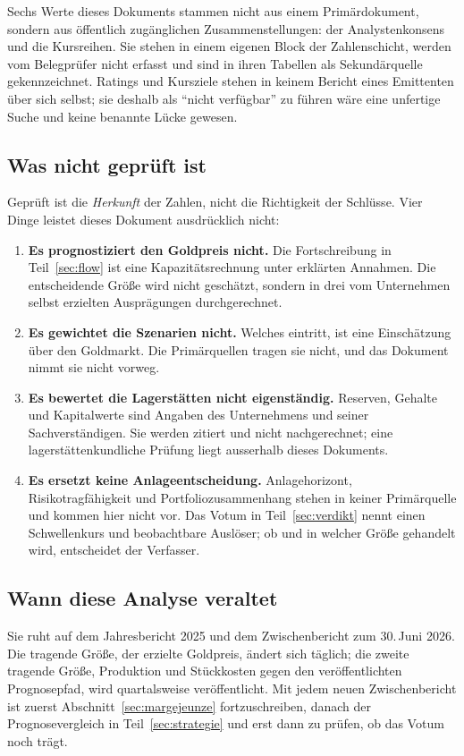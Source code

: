 Sechs Werte dieses Dokuments stammen nicht aus einem Prim\"ardokument,
sondern aus \"offentlich zug\"anglichen Zusammenstellungen: der
Analystenkonsens und die Kursreihen. Sie stehen in einem eigenen Block der
Zahlenschicht, werden vom Belegpr\"ufer nicht erfasst und sind in ihren
Tabellen als Sekund\"arquelle gekennzeichnet. Ratings und Kursziele stehen in
keinem Bericht eines Emittenten \"uber sich selbst; sie deshalb als
\enquote{nicht verf\"ugbar} zu f\"uhren w\"are eine unfertige Suche und keine
benannte L\"ucke gewesen.

\subsection*{Was nicht gepr\"uft ist}

Gepr\"uft ist die \emph{Herkunft} der Zahlen, nicht die Richtigkeit der
Schl\"usse. Vier Dinge leistet dieses Dokument ausdr\"ucklich nicht:

\begin{enumerate}
\item \textbf{Es prognostiziert den Goldpreis nicht.} Die Fortschreibung in
Teil~\ref{sec:flow} ist eine Kapazit\"atsrechnung unter erkl\"arten Annahmen.
Die entscheidende Gr\"o{\ss}e wird nicht gesch\"atzt, sondern in drei vom
Unternehmen selbst erzielten Auspr\"agungen durchgerechnet.
\item \textbf{Es gewichtet die Szenarien nicht.} Welches eintritt, ist eine
Einsch\"atzung \"uber den Goldmarkt. Die Prim\"arquellen tragen sie nicht, und
das Dokument nimmt sie nicht vorweg.
\item \textbf{Es bewertet die Lagerst\"atten nicht eigenst\"andig.} Reserven,
Gehalte und Kapitalwerte sind Angaben des Unternehmens und seiner
Sachverst\"andigen. Sie werden zitiert und nicht nachgerechnet; eine
lagerst\"attenkundliche Pr\"ufung liegt ausserhalb dieses Dokuments.
\item \textbf{Es ersetzt keine Anlageentscheidung.} Anlagehorizont,
Risikotragf\"ahigkeit und Portfoliozusammenhang stehen in keiner
Prim\"arquelle und kommen hier nicht vor. Das Votum in
Teil~\ref{sec:verdikt} nennt einen Schwellenkurs und beobachtbare Ausl\"oser;
ob und in welcher Gr\"o{\ss}e gehandelt wird, entscheidet der Verfasser.
\end{enumerate}

\subsection*{Wann diese Analyse veraltet}

Sie ruht auf dem Jahresbericht 2025 und dem Zwischenbericht zum
30.\,Juni 2026. Die tragende Gr\"o{\ss}e, der erzielte Goldpreis, \"andert
sich t\"aglich; die zweite tragende Gr\"o{\ss}e, Produktion und St\"uckkosten
gegen den ver\"offentlichten Prognosepfad, wird quartalsweise
ver\"offentlicht. Mit jedem neuen Zwischenbericht ist zuerst
Abschnitt~\ref{sec:margejeunze} fortzuschreiben, danach der Prognosevergleich
in Teil~\ref{sec:strategie} und erst dann zu pr\"ufen, ob das Votum noch
tr\"agt.
